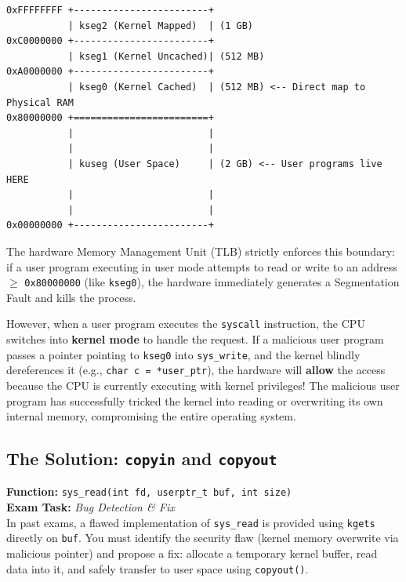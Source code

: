 \begin{verbatim}
0xFFFFFFFF +------------------------+
           | kseg2 (Kernel Mapped)  | (1 GB)
0xC0000000 +------------------------+
           | kseg1 (Kernel Uncached)| (512 MB)
0xA0000000 +------------------------+
           | kseg0 (Kernel Cached)  | (512 MB) <-- Direct map to Physical RAM
0x80000000 +========================+ 
           |                        |
           |                        |
           | kuseg (User Space)     | (2 GB) <-- User programs live HERE
           |                        |
           |                        |
0x00000000 +------------------------+
\end{verbatim}

The hardware Memory Management Unit (TLB) strictly enforces this boundary: if a user program executing in user mode attempts to read or write to an address $\geq$ \texttt{0x80000000} (like \texttt{kseg0}), the hardware immediately generates a Segmentation Fault and kills the process.

However, when a user program executes the \texttt{syscall} instruction, the CPU switches into \textbf{kernel mode} to handle the request. If a malicious user program passes a pointer pointing to \texttt{kseg0} into \texttt{sys\_write}, and the kernel blindly dereferences it (e.g., \texttt{char c = *user\_ptr}), the hardware will \textbf{allow} the access because the CPU is currently executing with kernel privileges! The malicious user program has successfully tricked the kernel into reading or overwriting its own internal memory, compromising the entire operating system.

\subsection{The Solution: \texttt{copyin} and \texttt{copyout}}

\begin{tcolorbox}[colback=red!5!white, colframe=red!75!black, title=\textbf{! EXAM FOCUS: IMPLEMENTATION REQUIRED}]
\textbf{Function:} \texttt{sys\_read(int fd, userptr\_t buf, int size)} \\
\textbf{Exam Task:} \textit{Bug Detection \& Fix} \\
In past exams, a flawed implementation of \texttt{sys\_read} is provided using \texttt{kgets} directly on \texttt{buf}. You must identify the security flaw (kernel memory overwrite via malicious pointer) and propose a fix: allocate a temporary kernel buffer, read data into it, and safely transfer to user space using \texttt{copyout()}.
\end{tcolorbox}

